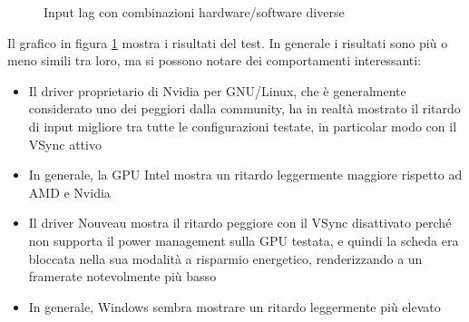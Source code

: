 \begin{figure}[h!]
	\centering
	\dataset
	\caption{Input lag con combinazioni hardware/software diverse}
	\label{fig:inputlag_os}
\end{figure}

Il grafico in figura \ref{fig:inputlag_os} mostra i risultati del test. In generale i risultati sono più o meno simili tra loro, ma si possono notare dei comportamenti interessanti:\begin{itemize}
	\item Il driver proprietario di Nvidia per GNU/Linux, che è generalmente considerato uno dei peggiori dalla community, ha in realtà mostrato il ritardo di input migliore tra tutte le configurazioni testate, in particolar modo con il VSync attivo
	\item In generale, la GPU Intel mostra un ritardo leggermente maggiore rispetto ad AMD e Nvidia
	\item Il driver Nouveau mostra il ritardo peggiore con il VSync disattivato perché non supporta il power management sulla GPU testata, e quindi la scheda era bloccata nella sua modalità a risparmio energetico, renderizzando a un framerate notevolmente più basso
	\item In generale, Windows sembra mostrare un ritardo leggermente più elevato
\end{itemize}

